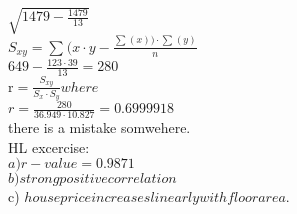 \documentclass{article}
\begin{document}
  $\sqrt{1479-\frac{1479}{13}}$\\
  $S_{xy}=\sum_{}^{}(x\cdot y-\frac{\sum_{}^{}(x))\cdot \sum_{}^{}(y)}{n}$\\
  $649-\frac{123\cdot39}{13}=280$\\
  r$=\frac{S_{xy}}{S_x \cdot S_y} where$\\
  $r=\frac{280}{36.949\cdot10.827}=0.6999918$\\
  there is a mistake somwehere.\\
  HL excercise:\\
  $a) r-value=0.9871$\\
  $b) strong positive correlation$\\
  c) $house price increases linearly with floor area$.\\

  
   
\end{document}
